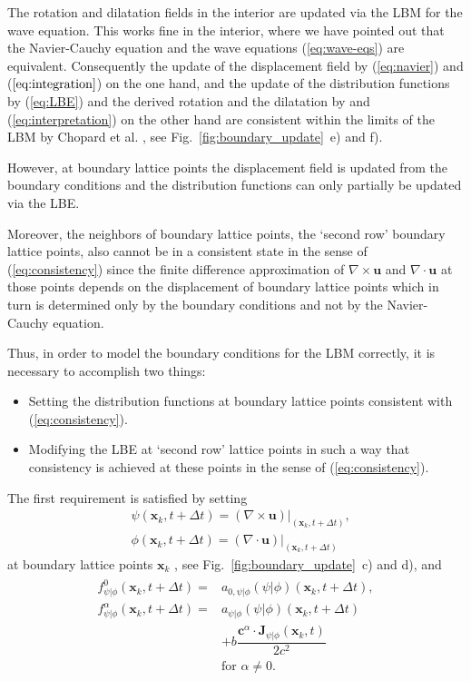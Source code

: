 \documentclass{article}
\renewcommand{\vec}{\boldsymbol}        %
\begin{document}
The rotation and dilatation fields in the interior are updated via the LBM for the wave equation. This works fine in the interior, where we have pointed out that the Navier-Cauchy equation and the wave equations (\ref{eq:wave-eqs}) are equivalent. Consequently the update of the displacement field by (\ref{eq:navier}) and ($\ref{eq:integration}$) on the one hand, and the update of the distribution functions by  (\ref{eq:LBE}) and the derived rotation and the dilatation by and (\ref{eq:interpretation}) on the other hand are consistent within the limits of the LBM by Chopard et al. \cite{chopard_lattice_1998},  see Fig.~\ref{fig:boundary_update}~e) and f).

However, at boundary lattice points the displacement field is updated from the boundary conditions and the distribution functions can only partially be updated via the LBE. 

Moreover, the neighbors of boundary lattice points, the `second row' boundary lattice points, also cannot be in a consistent state in the sense of (\ref{eq:consistency}) since the finite difference approximation of $\nabla\times\vec{u}$ and $\nabla\cdot\vec{u}$ at those points depends on the displacement of boundary lattice points which in turn is determined only by the boundary conditions and not by the Navier-Cauchy equation.

Thus, in order to model the boundary conditions for the LBM correctly, it is necessary to accomplish two things:
\begin{itemize}
    \item Setting the distribution functions at boundary lattice points consistent with (\ref{eq:consistency}).
    \item Modifying the LBE at ‘second row' lattice points in such a way that consistency is achieved at these points in the sense of (\ref{eq:consistency}).
\end{itemize}
The first requirement is satisfied by setting 
\begin{align}
    &\psi(\vec{x}_k,t+\Delta{t})=(\nabla\times\vec{u})\vert_{(\vec{x}_k,t+\Delta{t})}, \nonumber\\ &\phi(\vec{x}_k,t+\Delta{t})=(\nabla\cdot\vec{u})\vert_{(\vec{x}_k,t+\Delta{t})}
    \label{eq:psi_phi_at_bound}
\end{align}
at boundary lattice points $\boldsymbol{x}_k$ , see Fig.~\ref{fig:boundary_update}~c) and d), and 
\begin{align}
\begin{split}
    f_{\psi\vert\phi}^{0}(\vec{x}_k,t+\Delta{t}) = & a_{0,{\psi\vert\phi}} (\psi\vert\phi)(\vec{x}_k,t+\Delta{t}), \\  f_{\psi\vert\phi}^{\alpha}(\vec{x}_k,t+\Delta{t}) = & a_{{\psi\vert\phi}}(\psi\vert\phi)(\vec{x}_k,t+\Delta{t})\\& +  b \dfrac{\vec{c}^\alpha\cdot\vec{J}_{\psi\vert\phi}(\vec{x}_k,t)}{2c^2}\\
    &\text{for } \alpha\neq{0} .
    \label{eq:correction-f}
\end{split}
\end{align}
\end{document}
